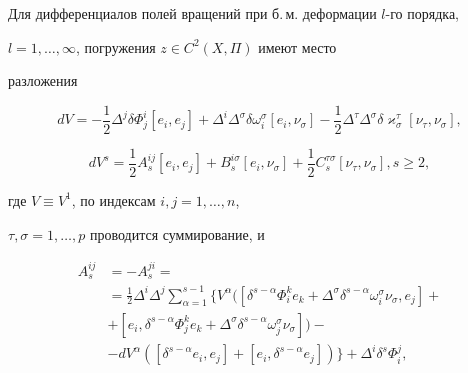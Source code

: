 \begin{lem}


Для дифференциалов полей вращений при б.\,м. деформации $l$-го порядка,


$l= 1,\dotsc,\infty$, погружения $z\in C^2(X,\Pi)$ имеют место


разложения


\begin{equation}


dV=-\frac{1}{2}\Delta^j\delta\Phi^i_j[e_i,e_j]+\Delta^i\Delta^{\sigma}


\delta\omega^{\sigma}_i[e_i,\nu_{\sigma}]-\frac{1}{2}\Delta^{\tau}


\Delta^{\sigma}\delta\varkappa^{\tau}_{\sigma}


[\nu_{\tau},\nu_{\sigma}],


\end{equation}


\begin{equation}


dV^s =\frac{1}{2}A^{ij}_s[e_i,e_j]+B^{i\sigma}_s[e_i,\nu_{\sigma}]


+\frac{1}{2}C^{\tau\sigma}_s[\nu_{\tau},\nu_{\sigma}], s\ge2,


\end{equation}


где $V\equiv V^1$, по индексам $i,j= 1,\dotsc,n$,


$\tau,\sigma= 1,\dotsc,p$ проводится суммирование, и


\begin{equation}


\begin{split}


A^{ij}_s &=-A^{ji}_s=\\


&=\frac{1}{2}\Delta^i\Delta^j\sum_{\alpha=1}^{s-1}\{


V^{\alpha}([\delta^{s-\alpha}\Phi^k_ie_k+


\Delta^{\sigma}\delta^{s-\alpha}\omega^{\sigma}_i\nu_{\sigma},e_j]+\\


&+[e_i,\delta^{s-\alpha}\Phi^k_je_k+


\Delta^\sigma\delta^{s-\alpha}\omega^{\sigma}_j\nu_{\sigma}])-\\


&-dV^{\alpha}([\delta^{s-\alpha}e_i,e_j]+


[e_i,\delta^{s-\alpha}e_j])\}+\Delta^i\delta^s\Phi^j_i,\\[2mm]



\end{split}
\end{equation}
\end{lem}

